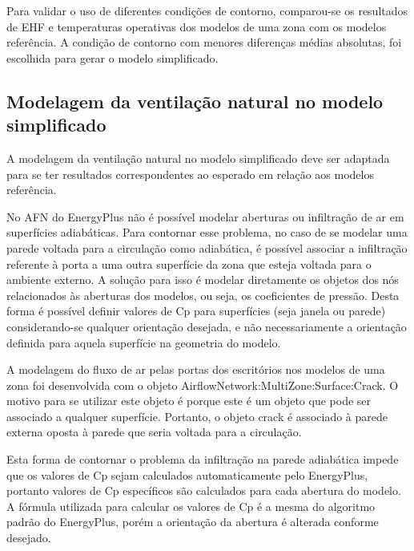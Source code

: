 \documentclass[brazil,hardcopy,openany,a5paper]{ufscthesis}
\begin{document}
		Para validar o uso de diferentes condições de contorno, comparou-se os resultados de EHF e temperaturas operativas dos modelos de uma zona com os modelos referência. A condição de contorno com menores diferenças médias absolutas, foi escolhida para gerar o modelo simplificado.
		
		\subsection{Modelagem da ventilação natural no modelo simplificado}
		
		A modelagem da ventilação natural no modelo simplificado deve ser adaptada para se ter resultados correspondentes ao esperado em relação aos modelos referência.
		
		No AFN do EnergyPlus não é possível modelar aberturas ou infiltração de ar em superfícies adiabáticas. Para contornar esse problema, no caso de se modelar uma parede voltada para a circulação como adiabática, é possível associar a infiltração referente à porta a uma outra superfície da zona que esteja voltada para o ambiente externo. A solução para isso é modelar diretamente os objetos dos nós relacionados às aberturas dos modelos, ou seja, os coeficientes de pressão. Desta forma é possível definir valores de Cp para superfícies (seja janela ou parede) considerando-se qualquer orientação desejada, e não necessariamente a orientação definida para aquela superfície na geometria do modelo.
		
		A modelagem do fluxo de ar pelas portas dos escritórios nos modelos de uma zona foi desenvolvida com o objeto AirflowNetwork:MultiZone:Surface:Crack. O motivo para se utilizar este objeto é porque este é um objeto que pode ser associado a qualquer superfície. Portanto, o objeto crack é associado à parede externa oposta à parede que seria voltada para a circulação.
		
		Esta forma de contornar o problema da infiltração na parede adiabática impede que os valores de Cp sejam calculados automaticamente pelo EnergyPlus, portanto valores de Cp específicos são calculados para cada abertura do modelo. A fórmula utilizada para calcular os valores de Cp é a mesma do algoritmo padrão do EnergyPlus, porém a orientação da abertura é alterada conforme desejado.
		
\end{document}
